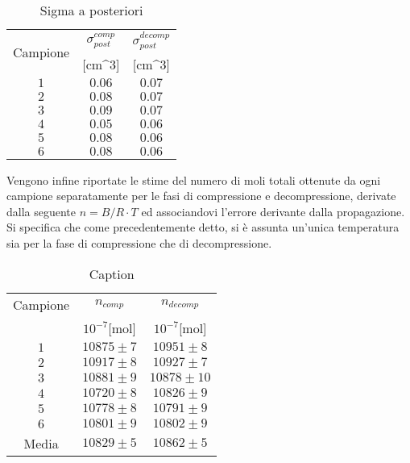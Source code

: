 \documentclass[a4paper,11pt,oneside]{article}
\begin{document}
\begin{table}[h!]
    \centering
    \begin{tabular}{|c|c|c|}
        \hline
        \multirow{2}{*}{Campione} & $\sigma_{post}^{comp}$ & $\sigma_{post}^{decomp}$\\ 
        & [cm^3] & [cm^3]\\ \hline
        \rowcolor[rgb]{0.85,0.85,0.85}$1$ & $0.06$ & $0.07$\\ \hline
        $2$ & $0.08$ & $0.07$\\ \hline
        \rowcolor[rgb]{0.85,0.85,0.85}$3$ & $0.09$ & $0.07$\\ \hline
        $4$ & $0.05$ & $0.06$\\ \hline
        \rowcolor[rgb]{0.85,0.85,0.85}$5$ & $0.08$ & $0.06$\\ \hline
        $6$ & $0.08$ & $0.06$\\ \hline
    \end{tabular}
    \caption{Sigma a posteriori}
    \label{tab:sigma_post}
\end{table}



Vengono infine riportate le stime del numero di moli totali ottenute da ogni campione separatamente per le fasi di compressione e decompressione, derivate dalla seguente $n=B/R \cdot T$ ed associandovi l'errore derivante dalla propagazione. Si specifica che come precedentemente detto, si è assunta un'unica temperatura sia per la fase di compressione che di decompressione.
\begin{table}[h!]
    \centering
    \begin{tabular}{|c|c|c|}
        \hline
        Campione & $n_{comp}$ & $n_{decomp}$\\ 
        & $10^{-7}$[mol] & $10^{-7}$[mol]\\ \hline
        $1$ & $10875\pm7$ &  $10951\pm8$\\ \hline
        $2$ & $10917\pm8$ &  $10927\pm7$\\ \hline
        $3$ & $10881\pm9$ &  $10878\pm10$\\ \hline
        $4$ & $10720\pm8$ &  $10826\pm9$\\ \hline
        $5$ & $10778\pm8$ &  $10791\pm9$\\ \hline
        $6$ & $10801\pm9$ &  $10802\pm9$\\ \hline
        Media & $10829\pm5$   & $10862\pm5$\\ \hline
    \end{tabular}
    \caption{Caption}
    \label{tab:my_label}
\end{table}
\end{document}
